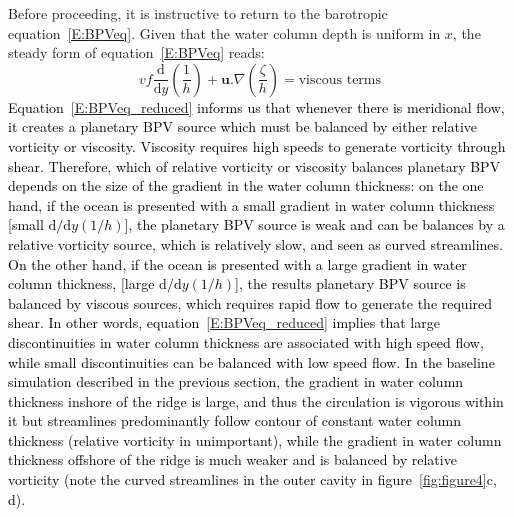 \documentclass[draft]{agujournal2019}
\newcommand{\blue}[1]{\textcolor{blue}{#1}}
\newcommand{\red}[1]{\textcolor{red}{#1}}
\renewcommand{\blue}[1]{{\textcolor{black}{#1}}} %
\renewcommand{\red}[1]{{}} %
\begin{document}
Before proceeding, it is instructive to return to the barotropic equation~\eqref{E:BPVeq}. Given that the water column depth is uniform in $x$, the steady form of equation~\eqref{E:BPVeq} reads:
\begin{equation}\label{E:BPVeq_reduced}
    v f  \frac{\mathrm{d}}{\mathrm{d}y} \left(\frac{1}{h}\right) + \mathbf{u}.\nabla \left(\frac{\zeta}{h}\right) = \text{viscous terms}
\end{equation}
\blue{Equation~\eqref{E:BPVeq_reduced} informs us that whenever there is meridional flow, it creates a planetary BPV source which must be balanced by either relative vorticity or viscosity. Viscosity requires high speeds to generate vorticity through shear. Therefore, which of relative vorticity or viscosity balances planetary BPV depends on the size of the gradient in the water column thickness: on the one hand, if the ocean is presented with a small gradient in water column thickness [small $\mathrm{d}/\mathrm{d}y(1/h)$], the planetary BPV source is weak and can be balances by a relative vorticity source, which is relatively slow, and seen as curved streamlines. On the other hand, if the ocean is presented with a large gradient in water column thickness, [large $\mathrm{d}/\mathrm{d}y(1/h)$], the results planetary BPV source is balanced by viscous sources, which requires rapid flow to generate the required shear. In other words, equation~\eqref{E:BPVeq_reduced} implies that large discontinuities in water column thickness are associated with high speed flow, while small discontinuities can be balanced with low speed flow. In the baseline simulation described in the previous section, the gradient in water column thickness inshore of the ridge is large, and thus the circulation is vigorous within it but streamlines predominantly follow contour of constant water column thickness (relative vorticity in unimportant), while the gradient in water column thickness offshore of the ridge is much weaker and is balanced by relative vorticity (note the curved streamlines in the outer cavity in figure~\ref{fig:figure4}c, d). }

\red{Note that both relative vorticity (second on the left-hand side) and viscous terms (right-hand side) in~\eqref{E:BPVeq_reduced} scale with the flow speed. A faster flow will therefore tend to increase these terms, hence they will be able to match a stretching BPV requirement (first term on the left-hand side) more easily. Thus, regions in the vicinity of a stronger topographic barrier [higher $\partial / \partial x (1/h)$], be associated with a strong barotropic flow.}
\end{document}
